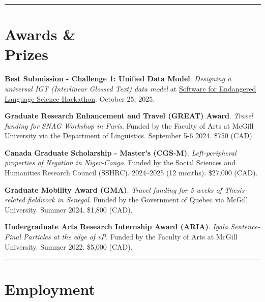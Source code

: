\documentclass[margin,line]{resume}
\begin{document}
\begin{resume}
	\vspace{-0.9em}\rule{\textwidth}{0.4pt}


		\vspace{-0.5em}

		\section{\mysidestyle Awards \&\\ Prizes}

		{\textbf{Best Submission - Challenge 1: Unified Data Model}. \textit{Designing a universal IGT (Interlinear Glossed Text) data model} at \href{https://sarahrmoeller.github.io/hackathon_flyer.html}{Software for Endangered Language Science Hackathon}. October 25, 2025.}
	
		{\textbf{Graduate Research Enhancement and Travel (GREAT) Award}. \textit{Travel funding for SNAG Workshop in Paris}. Funded by the Faculty of Arts at McGill University via the Department of Linguistics. September 5-6 2024. \$750 (CAD).}

\newpage

		{\textbf{Canada Graduate Scholarship - Master's (CGS-M)}. \textit{Left-peripheral properties of Negation in Niger-Congo}. Funded by the Social Sciences and Humanities Research Council (SSHRC). 2024--2025 (12 months). \$27,000 (CAD).}

		{\textbf{Graduate Mobility Award (GMA)}. \textit{Travel funding for 5 weeks of Thesis-related fieldwork in Senegal}. Funded by the Government of Quebec via McGill University. %
		Summer 2024. \$1,800 (CAD).}	
	

		{\textbf{Undergraduate Arts Research Internship Award (ARIA)}. \textit{Igala Sentence-Final Particles at the edge of \textit{v}P}. Funded by the Faculty of Arts at McGill University. %
		Summer 2022. \$5,000 (CAD).}
	
		\vspace{-0.7em}\rule{\textwidth}{0.4pt}


	\vspace{-0.5em}


	\section{\mysidestyle Employment}


\end{resume}
\end{document}
